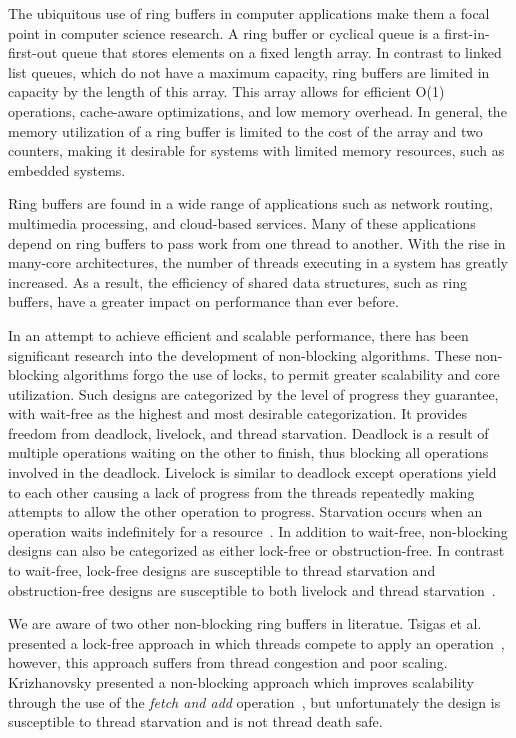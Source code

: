 The ubiquitous use of ring buffers in computer applications make them a focal point in computer science research.
A ring buffer or cyclical queue is a first-in-first-out queue that stores elements on a fixed length array.
In contrast to linked list queues, which do not have a maximum capacity, ring buffers are limited in capacity by the length of this array.
This array allows for efficient O(1) operations, cache-aware optimizations, and low memory overhead.
In general, the memory utilization of a ring buffer is limited to the cost of the array and two counters, making it desirable for systems with limited memory resources, such as embedded systems.

Ring buffers are found in a wide range of applications such as network routing, multimedia processing, and cloud-based services.
Many of these applications depend on ring buffers to pass work from one thread to another.
With the rise in many-core architectures, the number of threads executing in a system has greatly increased.
As a result, the efficiency of shared data structures, such as ring buffers, have a greater impact on performance than ever before.

In an attempt to achieve efficient and scalable performance, there has been significant research into the development of non-blocking algorithms.
These non-blocking algorithms forgo the use of locks, to permit greater scalability and core utilization.
Such designs are categorized by the level of progress they guarantee, with wait-free as the highest and most desirable categorization.
It provides freedom from deadlock, livelock, and thread starvation.
Deadlock is a result of multiple operations waiting on the other to finish, thus blocking all operations involved in the deadlock.
Livelock is similar to deadlock except operations yield to each other causing a lack of progress from the threads repeatedly making attempts to allow the other operation to progress.
Starvation occurs when an operation waits indefinitely for a resource~\cite{herlihy_bible}.
In addition to wait-free, non-blocking designs can also be categorized as either lock-free or obstruction-free.
In contrast to wait-free, lock-free designs are susceptible to thread starvation and obstruction-free designs are susceptible to both livelock and thread starvation~\cite{herlihy_bible}.

We are aware of two other non-blocking ring buffers in literatue.
Tsigas et al. presented a lock-free approach in which threads compete to apply an operation~\cite{tsigas}, however, this approach suffers from thread congestion and poor scaling.
Krizhanovsky presented a non-blocking approach which improves scalability through the use of the \emph{fetch and add} operation~\cite{?}, but unfortunately the design is susceptible to thread starvation and is not thread death safe.


